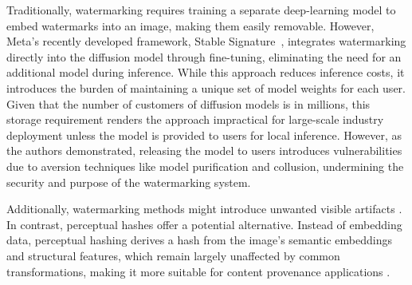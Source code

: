 Traditionally, watermarking requires training a separate deep-learning model to embed watermarks into an image, making them easily removable. However, Meta's recently developed framework, Stable Signature~\cite{meta2023stablesig}, integrates watermarking directly into the diffusion model through fine-tuning, eliminating the need for an additional model during inference. While this approach reduces inference costs, it introduces the burden of maintaining a unique set of model weights for each user. Given that the number of customers of diffusion models is in millions, this storage requirement renders the approach impractical for large-scale industry deployment unless the model is provided to users for local inference. However, as the authors demonstrated, releasing the model to users introduces vulnerabilities due to aversion techniques like model purification and collusion, undermining the security and purpose of the watermarking system.

Additionally, watermarking methods might introduce unwanted visible artifacts \cite{waves}. In contrast, perceptual hashes offer a potential alternative. Instead of embedding data, perceptual hashing derives a hash from the image’s semantic embeddings and structural features, which remain largely unaffected by common transformations, making it more suitable for content provenance applications \cite{phash2020}.


